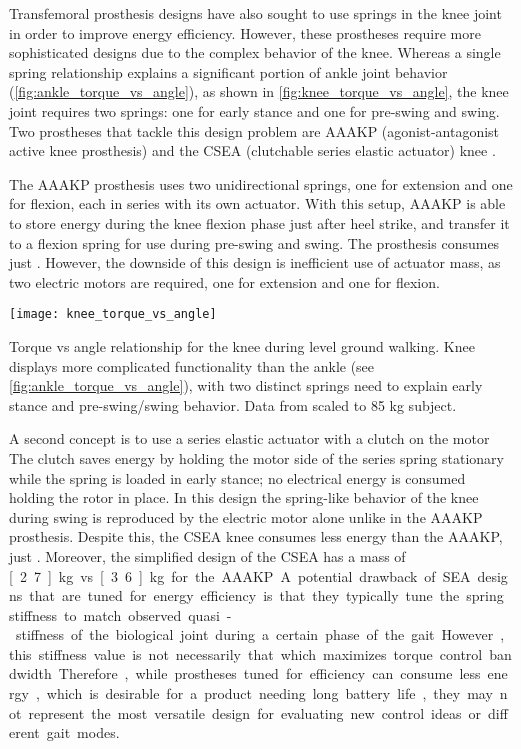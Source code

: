 Transfemoral prosthesis designs have also sought to use springs in the knee
joint in order to improve energy efficiency. However, these prostheses require
more sophisticated designs due to the complex behavior of the knee. Whereas a
single spring relationship explains a significant portion of ankle joint
behavior (\cref{fig:ankle_torque_vs_angle}), as shown in
\cref{fig:knee_torque_vs_angle}, the knee joint requires two springs: one for
early stance and one for pre-swing and swing. Two prostheses that tackle this
design problem are AAAKP (agonist-antagonist active knee prosthesis)
\citep{martinez2008design, martinez2011antagonistic} and the CSEA (clutchable
series elastic actuator) knee \citep{rouse2014clutchable, rouse2015design}.

The AAAKP prosthesis uses two unidirectional springs, one for extension and one
for flexion, each in series with its own actuator. With this setup,
AAAKP is able to store energy during the knee flexion phase just after heel
strike, and transfer it to a flexion spring for use during pre-swing and swing.
The prosthesis consumes just . However, the downside of
this design is inefficient use of actuator mass, as two electric motors are
required, one for extension and one for flexion.
\begin{marginfigure}[0in]
    \centering
    \texttt{[image: knee\_torque\_vs\_angle]}
    \caption{Torque vs angle relationship for the knee during level ground
    walking. Knee displays more complicated functionality than the ankle (see
    \cref{fig:ankle_torque_vs_angle}), with two distinct springs need to explain
    early stance and pre-swing/swing behavior. Data from
    \citet{winter2009biomechanics} scaled to 85 kg subject.}
    \label{fig:knee_torque_vs_angle}
\end{marginfigure}

A second concept is to use a series elastic actuator with a clutch on the motor
\citep{rouse2014clutchable, rouse2015design} The clutch saves energy by holding
the motor side of the series spring stationary while the spring is loaded in
early stance; no electrical energy is consumed holding the rotor in place. In
this design the spring-like behavior of the knee during swing is reproduced by
the electric motor alone unlike in the AAAKP prosthesis. Despite this, the
CSEA knee consumes less energy than the AAAKP, just .
Moreover, the simplified design of the CSEA has a mass of \unit[2.7]{kg} vs
\unit[3.6]{kg} for the AAAKP.

A potential drawback of SEA designs that are tuned for energy efficiency is that
they typically tune the spring stiffness to match observed quasi-stiffness
of the biological joint during a certain phase of the gait. However, this
stiffness value is not necessarily that which maximizes torque control
bandwidth. Therefore, while prostheses tuned for efficiency can consume less
energy, which is desirable for a product needing long battery life, they may
not represent the most versatile design for evaluating new control ideas or
different gait modes. 
